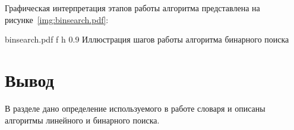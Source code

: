 \clearpage

Графическая интерпретация этапов работы алгоритма представлена на рисунке~\ref{img:binsearch.pdf}:

{binsearch.pdf} %
{f} %
{h} %
{0.9 \textwidth} %
{Иллюстрация шагов работы алгоритма бинарного поиска} %

\section*{Вывод}    

В разделе дано определение используемого в работе словаря и описаны алгоритмы линейного и бинарного поиска.